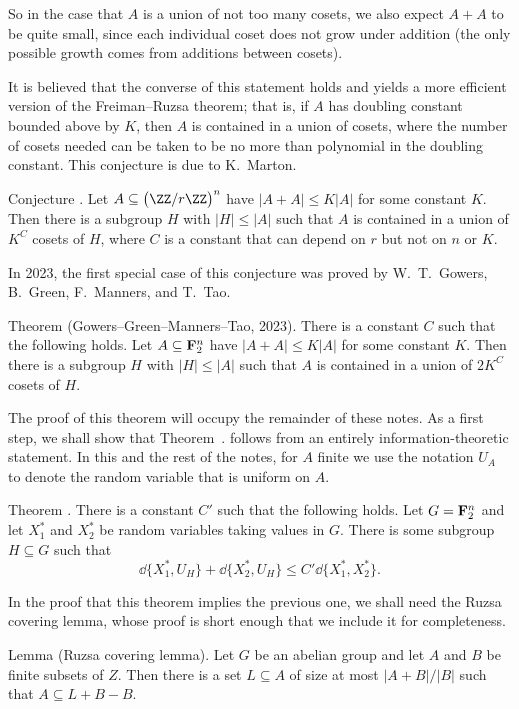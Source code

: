 So in the case that $A$ is a union of not too many cosets, we also expect $A+A$ to be quite small, since
each individual coset does not grow under addition (the only possible growth comes from additions between cosets).

It is believed that the converse of this statement holds and yields a more efficient version
of the Freiman--Ruzsa theorem; that is,
if $A$ has doubling constant bounded above by $K$, then $A$ is contained in a union of cosets,
where the number of cosets needed can be taken to be no more than polynomial in the doubling constant.
This conjecture is due to K.~Marton.

\proclaim Conjecture \advthm. Let $A\subseteq \bigl(\ZZ/r\ZZ\bigr)^n$ have $|A+A|\le K|A|$
for some constant $K$. Then there is a subgroup $H$ with $|H|\le |A|$ such that $A$
is contained in a union of $K^C$ cosets of $H$, where $C$ is a constant that can depend
on $r$ but not on $n$ or $K$.

In 2023, the first special case of this conjecture was proved by W.~T.~Gowers, B.~Green, F.~Manners, and
T.~Tao.

\edef\thmpfr{\the\sectcount.\the\thmcount}
\parenproclaim Theorem {\advthm} (Gowers--Green--Manners--Tao, {\rm 2023}).
There is a constant $C$ such that the following holds.
Let $A\subseteq {\bf F}_2^n$ have $|A+A|\le K|A|$
for some constant $K$. Then there is a subgroup $H$ with $|H|\le |A|$ such that $A$
is contained in a union of $2K^C$ cosets of $H$.

The proof of this theorem will occupy the
remainder of these notes. As a first step, we shall show that
Theorem~{\thmpfr} follows from an entirely information-theoretic statement.
In this and the rest of the notes, for $A$ finite
we use the notation $U_A$ to denote the random variable that is uniform on $A$.

\edef\thmsubgroup{\the\sectcount.\the\thmcount}
\proclaim Theorem \advthm. There is a constant $C'$ such that the following holds.
Let $G = {\bf F}_2^n$ and let $X_1^*$ and $X_2^*$ be random variables taking values in
$G$. There is some subgroup $H\subseteq G$ such that
$$\dd\{ X_1^*, U_H\} + \dd\{ X_2^*, U_H\} \le C'\dd\{X_1^*, X_2^*\}.$$

In the proof that this theorem implies the previous one, we shall need the Ruzsa covering lemma,
whose proof is short enough that we include it for completeness.

\edef\lemruzsacovering{\the\sectcount.\the\thmcount}
\parenproclaim Lemma {\advthm} (Ruzsa covering lemma). Let $G$ be an abelian group and let $A$ and
$B$ be finite subsets of $Z$. Then there is a set $L\subseteq A$ of size at most $|A+B|/|B|$ such that
$A\subseteq L+B-B$.

